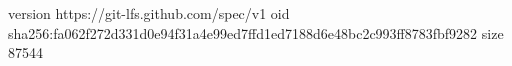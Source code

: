 version https://git-lfs.github.com/spec/v1
oid sha256:fa062f272d331d0e94f31a4e99ed7ffd1ed7188d6e48bc2c993ff8783fbf9282
size 87544
